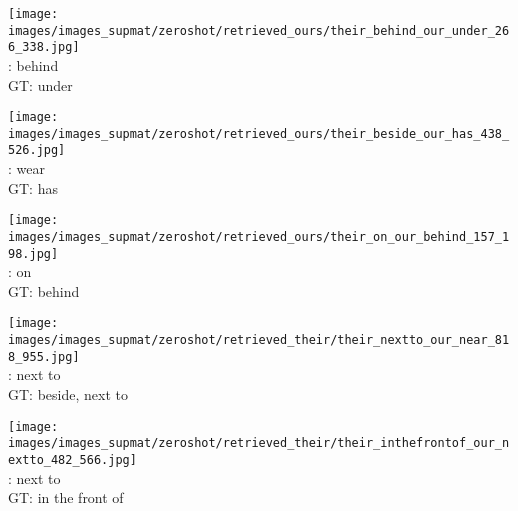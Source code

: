 \documentclass[10pt,twocolumn,letterpaper]{article}
\begin{document}
\begin{figure*}[t]
    \begin{minipage}[t]{0.185\textwidth}
    	\centering
       	\texttt{[image: images/images\_supmat/zeroshot/retrieved\_ours/their\_behind\_our\_under\_266\_338.jpg]}\\
       	\vspace{0.3ex}
       	\cite{Lu16}: behind \\
       	GT: under
       	\vspace{2ex}
    \end{minipage}
    \hspace{0.005\textwidth}
    \begin{minipage}[t]{0.185\textwidth}
    	\centering
       	\texttt{[image: images/images\_supmat/zeroshot/retrieved\_ours/their\_beside\_our\_has\_438\_526.jpg]}\\
       	\vspace{0.3ex}
       	\cite{Lu16}: wear \\
       	GT: has
       	\vspace{0.2ex}
    \end{minipage}
    \hspace{0.005\textwidth}
    \begin{minipage}[t]{0.185\textwidth}
       \centering
       \texttt{[image: images/images\_supmat/zeroshot/retrieved\_ours/their\_on\_our\_behind\_157\_198.jpg]}\\
       \vspace{0.3ex}
       \cite{Lu16}: on \\
       GT: behind
       \vspace{0.2ex}
    \end{minipage}
    \hspace{0.005\textwidth}
    \begin{minipage}[t]{0.185\textwidth}
    	\centering
       	\texttt{[image: images/images\_supmat/zeroshot/retrieved\_their/their\_nextto\_our\_near\_818\_955.jpg]}\\
       	\vspace{0.3ex}
       	\cite{Lu16}: next to \\
       	GT: beside, next to
       	\vspace{0.2ex}
    \end{minipage}
    \hspace{0.005\textwidth}  
    \begin{minipage}[t]{0.185\textwidth}
    	\centering
       	\texttt{[image: images/images\_supmat/zeroshot/retrieved\_their/their\_inthefrontof\_our\_nextto\_482\_566.jpg]}\\
		\vspace{0.3ex}       	
       	\cite{Lu16}: next to \\
       	GT: in the front of
      	\vspace{0.2ex}
    \end{minipage} 



\end{figure*}
\end{document}
